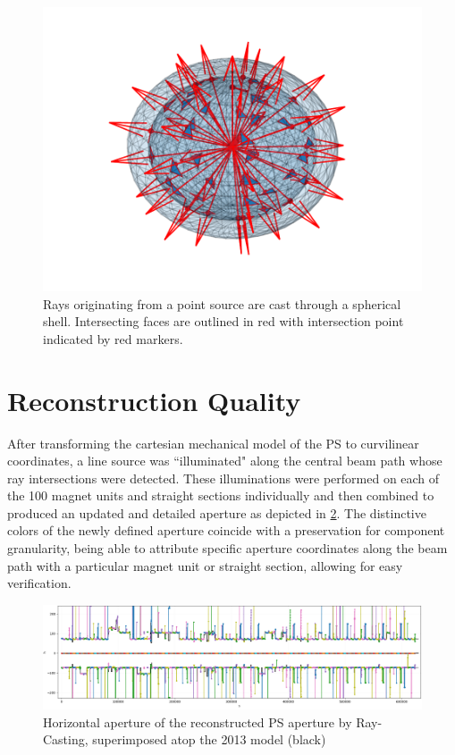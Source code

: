\begin{figure}
    \centering
    \includegraphics{figs/shell.pdf}
    \caption{Rays originating from a point source are cast through a spherical shell. Intersecting faces are outlined in red with intersection point indicated by red markers.}
    \label{fig:ray_casting}
\end{figure}

\section{Reconstruction Quality}

After transforming the cartesian mechanical model of the PS to curvilinear coordinates, a line source was ``illuminated" along the central beam path whose ray intersections were detected. These illuminations were performed on each of the 100 magnet units and straight sections individually and then combined to produced an updated and detailed aperture as depicted in \ref{fig:ps_aperture}. The distinctive colors of the newly defined aperture coincide with a preservation for component granularity, being able to attribute specific aperture coordinates along the beam path with a particular magnet unit or straight section, allowing for easy verification.

\begin{figure}
    \centering
    \includegraphics[width=\linewidth]{figs/ps_aperture.png}
    \caption{Horizontal aperture of the reconstructed PS aperture by Ray-Casting, superimposed atop the 2013 model (black)}
    \label{fig:ps_aperture}
\end{figure}

